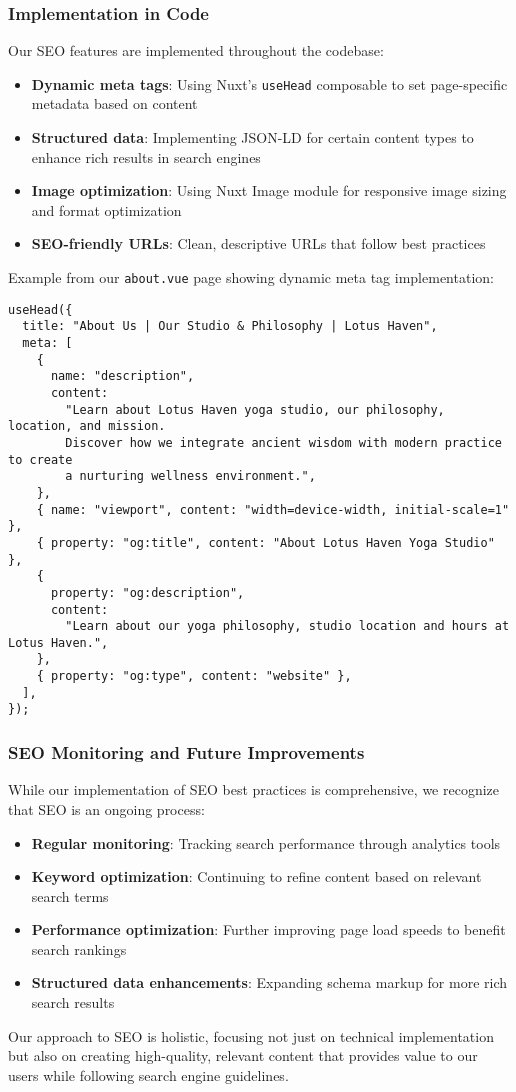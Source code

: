\subsubsection{Implementation in Code}

Our SEO features are implemented throughout the codebase:

\begin{itemize}
    \item \textbf{Dynamic meta tags}: Using Nuxt's \texttt{useHead} composable to set page-specific metadata based on content
    \item \textbf{Structured data}: Implementing JSON-LD for certain content types to enhance rich results in search engines
    \item \textbf{Image optimization}: Using Nuxt Image module for responsive image sizing and format optimization
    \item \textbf{SEO-friendly URLs}: Clean, descriptive URLs that follow best practices
\end{itemize}

Example from our \texttt{about.vue} page showing dynamic meta tag implementation:

\begin{verbatim}
useHead({
  title: "About Us | Our Studio & Philosophy | Lotus Haven",
  meta: [
    {
      name: "description",
      content:
        "Learn about Lotus Haven yoga studio, our philosophy, location, and mission. 
        Discover how we integrate ancient wisdom with modern practice to create 
        a nurturing wellness environment.",
    },
    { name: "viewport", content: "width=device-width, initial-scale=1" },
    { property: "og:title", content: "About Lotus Haven Yoga Studio" },
    {
      property: "og:description",
      content:
        "Learn about our yoga philosophy, studio location and hours at Lotus Haven.",
    },
    { property: "og:type", content: "website" },
  ],
});
\end{verbatim}

\subsubsection{SEO Monitoring and Future Improvements}

While our implementation of SEO best practices is comprehensive, we recognize that SEO is an ongoing process:

\begin{itemize}
    \item \textbf{Regular monitoring}: Tracking search performance through analytics tools
    \item \textbf{Keyword optimization}: Continuing to refine content based on relevant search terms
    \item \textbf{Performance optimization}: Further improving page load speeds to benefit search rankings
    \item \textbf{Structured data enhancements}: Expanding schema markup for more rich search results
\end{itemize}

Our approach to SEO is holistic, focusing not just on technical implementation but also on creating high-quality, relevant content that provides value to our users while following search engine guidelines.
